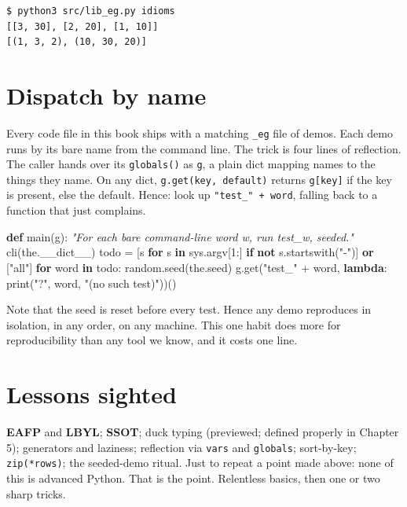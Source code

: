 \documentclass[
  justified]{tufte-book}
\newenvironment{Shaded}{}{}
\newcommand{\BuiltInTok}[1]{\textcolor[rgb]{0.00,0.50,0.00}{#1}}
\newcommand{\CommentTok}[1]{\textcolor[rgb]{0.38,0.63,0.69}{\textit{#1}}}
\newcommand{\ControlFlowTok}[1]{\textcolor[rgb]{0.00,0.44,0.13}{\textbf{#1}}}
\newcommand{\DecValTok}[1]{\textcolor[rgb]{0.25,0.63,0.44}{#1}}
\newcommand{\KeywordTok}[1]{\textcolor[rgb]{0.00,0.44,0.13}{\textbf{#1}}}
\newcommand{\NormalTok}[1]{#1}
\newcommand{\OperatorTok}[1]{\textcolor[rgb]{0.40,0.40,0.40}{#1}}
\newcommand{\StringTok}[1]{\textcolor[rgb]{0.25,0.44,0.63}{#1}}
\begin{document}
\begin{verbatim}
$ python3 src/lib_eg.py idioms
[[3, 30], [2, 20], [1, 10]]
[(1, 3, 2), (10, 30, 20)]
\end{verbatim}

\section{Dispatch by name}\label{dispatch-by-name}

Every code file in this book ships with a matching \texttt{\_eg} file of
demos. Each demo runs by its bare name from the command line. The trick
is four lines of reflection. The caller hands over its
\texttt{globals()} as \texttt{g}, a plain dict mapping names to the
things they name. On any dict, \texttt{g.get(key,\ default)} returns
\texttt{g{[}key{]}} if the key is present, else the default. Hence: look
up \texttt{"test\_"\ +\ word}, falling back to a function that just
complains.

\begin{Shaded}
\begin{Highlighting}[]
\KeywordTok{def}\NormalTok{ main(g):}
  \CommentTok{"For each bare command{-}line word w, run test\_w, seeded."}
\NormalTok{  cli(the.\_\_dict\_\_)}
\NormalTok{  todo }\OperatorTok{=}\NormalTok{ [s }\ControlFlowTok{for}\NormalTok{ s }\KeywordTok{in}\NormalTok{ sys.argv[}\DecValTok{1}\NormalTok{:]}
          \ControlFlowTok{if} \KeywordTok{not}\NormalTok{ s.startswith(}\StringTok{"{-}"}\NormalTok{)] }\KeywordTok{or}\NormalTok{ [}\StringTok{"all"}\NormalTok{]}
  \ControlFlowTok{for}\NormalTok{ word }\KeywordTok{in}\NormalTok{ todo:}
\NormalTok{    random.seed(the.seed)}
\NormalTok{    g.get(}\StringTok{"test\_"} \OperatorTok{+}\NormalTok{ word,}
          \KeywordTok{lambda}\NormalTok{: }\BuiltInTok{print}\NormalTok{(}\StringTok{"?"}\NormalTok{, word, }\StringTok{"(no such test)"}\NormalTok{))()}
\end{Highlighting}
\end{Shaded}

Note that the seed is reset before every test. Hence any demo reproduces
in isolation, in any order, on any machine. This one habit does more for
reproducibility than any tool we know, and it costs one line.

\section{Lessons sighted}\label{lessons-sighted}

\textbf{EAFP} and \textbf{LBYL}; \textbf{SSOT}; duck typing (previewed;
defined properly in Chapter 5); generators and laziness; reflection via
\texttt{vars} and \texttt{globals}; sort-by-key; \texttt{zip(*rows)};
the seeded-demo ritual. Just to repeat a point made above: none of this
is advanced Python. That is the point. Relentless basics, then one or
two sharp tricks.
\end{document}
